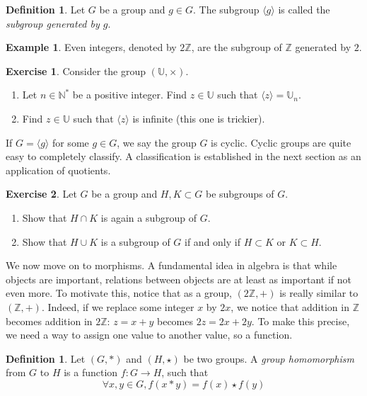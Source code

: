 \documentclass{book}
\newcommand{\N}{\mathbb{N}}
\newcommand{\Z}{\mathbb{Z}}
\newcommand{\U}{\mathbb{U}}
\theoremstyle{plain}
\theoremstyle{definition}
\newtheorem{definition}[theorem]{Definition}
\newtheorem{example}[theorem]{Example}
\newtheorem{exercise}{Exercise}[section]
\theoremstyle{remark}
\begin{document}
\begin{definition}
    Let $G$ be a group and $g \in G$. The subgroup $\langle g \rangle$ is called the \emph{subgroup generated by $g$}.
\end{definition}

\begin{example}
    Even integers, denoted by $2\Z$, are the subgroup of $\Z$ generated by $2$.
\end{example}

\begin{exercise}
    Consider the group $(\U,\times)$.
    \begin{enumerate}
        \item Let $n \in \N^*$ be a positive integer. Find $z \in \U$ such that $\langle z \rangle = \U_n$.
        \item Find $z \in\U$ such that $\langle z \rangle$ is infinite (this one is trickier).
    \end{enumerate}
\end{exercise}

If $G = \langle g\rangle$ for some $g \in G$, we say the group $G$ is cyclic. Cyclic groups are quite easy to completely classify. A classification is established in the next section as an application of quotients.

\begin{exercise}
    Let $G$ be a group and $H,K \subset G$ be subgroups of $G$.
    \begin{enumerate}
        \item Show that $H \cap K$ is again a subgroup of $G$.
        \item Show that $H \cup K$ is a subgroup of $G$ if and only if $H \subset K$ or $K \subset H$.
    \end{enumerate}
\end{exercise}

We now move on to morphisms. A fundamental idea in algebra is that while objects are important, relations between objects are at least as important if not even more. To motivate this, notice that as a group, $(2\Z,+)$ is really similar to $(\Z,+)$. Indeed, if we replace some integer $x$ by $2x$, we notice that addition in $\Z$ becomes addition in $2\Z$: $z = x+y$ becomes $2z = 2x + 2y$. To make this precise, we need a way to assign one value to another value, so a function.

\begin{definition}
    Let $(G,*)$ and $(H,\star)$ be two groups. A \emph{group homomorphism} from $G$ to $H$ is a function $f : G \to H$, such that
    \[\forall x,y \in G, f(x * y) = f(x) \star f(y)\]
\end{definition}
\end{document}
